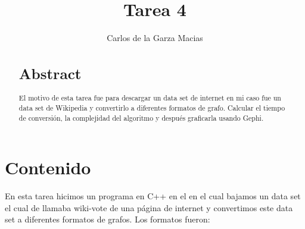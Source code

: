 \documentclass[acmsmall]{acmart}
\begin{document}
\title{Tarea 4}

\author{Carlos de la Garza Macias}


\begin{abstract}
\section{Abstract}
  El motivo de esta tarea fue para descargar un data set de internet en mi caso fue un data set de Wikipedia y convertirlo a diferentes formatos de grafo. Calcular el tiempo de conversión, la complejidad del algoritmo y después graficarla usando Gephi. 
   
\end{abstract}




\maketitle

\section{Contenido}
En esta tarea hicimos un programa en C++ en el en el cual bajamos un data set el cual de llamaba wiki-vote de una página de internet y convertimos este data set a diferentes formatos de grafos. Los formatos fueron:
\end{document}

